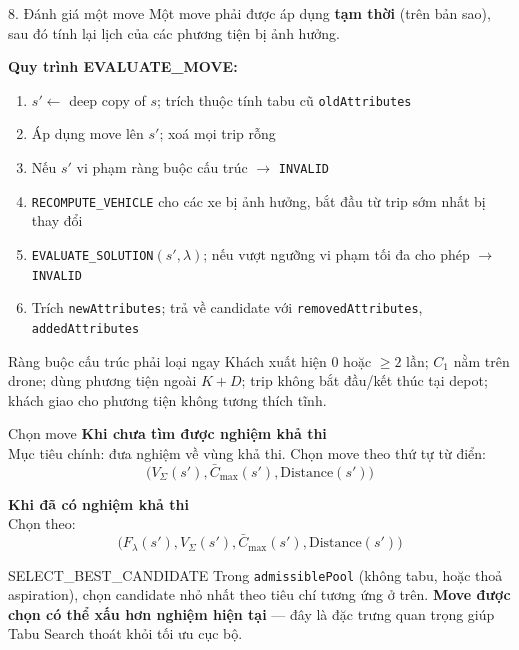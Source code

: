 \documentclass[aspectratio=169]{beamer}
\newcommand{\hl}[1]{\textcolor{blue!60!black}{\textbf{#1}}}
\begin{document}
\begin{frame}{8. Đánh giá một move}
  \small Một move phải được áp dụng \hl{tạm thời} (trên bản sao), sau đó tính lại lịch của các phương tiện bị ảnh hưởng.

  \vspace{2mm}
  \textbf{Quy trình EVALUATE\_MOVE:}
  \begin{enumerate}
    \item \small $s' \leftarrow$ deep copy of $s$; trích thuộc tính tabu cũ \texttt{oldAttributes}
    \item \small Áp dụng move lên $s'$; xoá mọi trip rỗng
    \item \small Nếu $s'$ vi phạm ràng buộc cấu trúc $\to$ \texttt{INVALID}
    \item \small \texttt{RECOMPUTE\_VEHICLE} cho các xe bị ảnh hưởng, bắt đầu từ trip sớm nhất bị thay đổi
    \item \small \texttt{EVALUATE\_SOLUTION}$(s', \lambda)$; nếu vượt ngưỡng vi phạm tối đa cho phép $\to$ \texttt{INVALID}
    \item \small Trích \texttt{newAttributes}; trả về candidate với \texttt{removedAttributes}, \texttt{addedAttributes}
  \end{enumerate}

  \vspace{2mm}
  \begin{alertblock}{Ràng buộc cấu trúc phải loại ngay}
    \small Khách xuất hiện 0 hoặc $\ge 2$ lần; $C_1$ nằm trên drone; dùng phương tiện ngoài $K+D$; trip không bắt đầu/kết thúc tại depot; khách giao cho phương tiện không tương thích tĩnh.
  \end{alertblock}
\end{frame}

\begin{frame}{ Chọn move}
  \textbf{ Khi chưa tìm được nghiệm khả thi}\\
  \small Mục tiêu chính: đưa nghiệm về vùng khả thi. Chọn move theo thứ tự từ điển:
  $$\big(V_\Sigma(s'), \bar{C}_{\max}(s'), \text{Distance}(s')\big)$$

  \vspace{3mm}
  \textbf{ Khi đã có nghiệm khả thi}\\
  \small Chọn theo:
  $$\big(F_\lambda(s'), V_\Sigma(s'), \bar{C}_{\max}(s'), \text{Distance}(s')\big)$$

  \vspace{3mm}
  \begin{block}{SELECT\_BEST\_CANDIDATE}
    \small Trong \texttt{admissiblePool} (không tabu, hoặc thoả aspiration), chọn candidate nhỏ nhất theo tiêu chí tương ứng ở trên. \hl{Move được chọn có thể xấu hơn nghiệm hiện tại} — đây là đặc trưng quan trọng giúp Tabu Search thoát khỏi tối ưu cục bộ.
  \end{block}
\end{frame}
\end{document}
